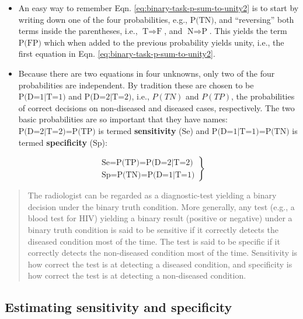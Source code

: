 \documentclass[
]{book}
\begin{document}
\begin{itemize}
\item
  An easy way to remember Eqn. \eqref{eq:binary-task-p-sum-to-unity2} is to start by writing down one of the four probabilities, e.g., \(\text{P(TN)}\), and ``reversing'' both terms inside the parentheses, i.e., \(\text{T} \Rightarrow \text{F}\), and \(\text{N} \Rightarrow \text{P}\). This yields the term \(\text{P(FP)}\) which when added to the previous probability yields unity, i.e., the first equation in Eqn. \eqref{eq:binary-task-p-sum-to-unity2}.
\item
  Because there are two equations in four unknowns, only two of the four probabilities are independent. By tradition these are chosen to be \(\text{P(D=1|T=1)}\) and \(\text{P(D=2|T=2)}\), i.e., \(P(TN)\) and \(P(TP)\), the probabilities of correct decisions on non-diseased and diseased cases, respectively. The two basic probabilities are so important that they have names: \(\text{P(D=2|T=2)=P(TP)}\) is termed \textbf{sensitivity} (Se) and \(\text{P(D=1|T=1)=P(TN)}\) is termed \textbf{specificity} (Sp):
\end{itemize}

\begin{equation} 
\left.
\begin{aligned}  
\text{Se}=\text{P(TP)=P(D=2|T=2)}\\ 
\text{Sp}=\text{P(TN)=P(D=1|T=1)}
\end{aligned}
\right \}
\label{eq:binary-task-se-sp}
\end{equation}

\begin{quote}
The radiologist can be regarded as a diagnostic-test yielding a binary decision under the binary truth condition. More generally, any test (e.g., a blood test for HIV) yielding a binary result (positive or negative) under a binary truth condition is said to be sensitive if it correctly detects the diseased condition most of the time. The test is said to be specific if it correctly detects the non-diseased condition most of the time. Sensitivity is how correct the test is at detecting a diseased condition, and specificity is how correct the test is at detecting a non-diseased condition.
\end{quote}

\hypertarget{estimating-sensitivity-and-specificity}{%
\subsection{Estimating sensitivity and specificity}\label{estimating-sensitivity-and-specificity}}
\end{document}
